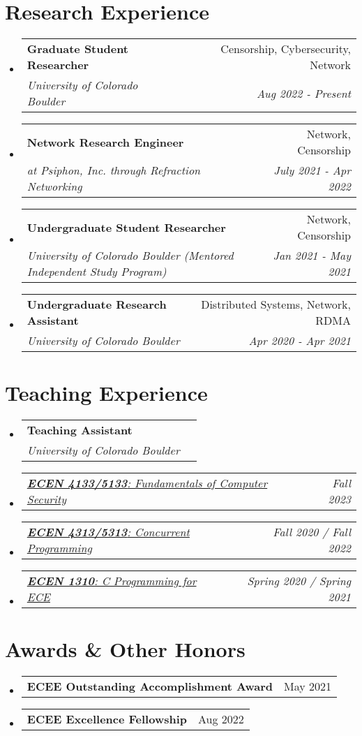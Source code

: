 \documentclass[letterpaper,11pt]{article}
\makeatletter
\newcommand{\resumeSubheading}[4]{
  \vspace{-2pt}\item
    \begin{tabular*}{0.97\textwidth}[t]{l@{\extracolsep{\fill}}r}
      \textbf{#1} & #2 \\
      \textit{\small#3} & \textit{\small #4} \\
    \end{tabular*}\vspace{-7pt}
}
\newcommand{\resumeSubSubheading}[2]{
    \item
    \begin{tabular*}{0.97\textwidth}{l@{\extracolsep{\fill}}r}
      \textit{\small#1} & \textit{\small #2} \\
    \end{tabular*}\vspace{-7pt}
}
\newcommand{\resumeProjectHeading}[2]{
    \item
    \begin{tabular*}{0.97\textwidth}{l@{\extracolsep{\fill}}r}
      \small#1 & #2 \\
    \end{tabular*}\vspace{-7pt}
}
\newcommand{\resumeSubHeadingListStart}{\begin{itemize}[leftmargin=0.15in, label={}]}
\newcommand{\resumeSubHeadingListEnd}{\end{itemize}}
\makeatother
\begin{document}
\section{Research Experience}
\resumeSubHeadingListStart
\resumeSubheading
{Graduate Student Researcher}{Censorship, Cybersecurity, Network}
{University of Colorado Boulder}{Aug 2022 - Present}
\resumeSubheading
{Network Research Engineer}{Network, Censorship}
{at Psiphon, Inc. through Refraction Networking}{July 2021 - Apr 2022}
\resumeSubheading
{Undergraduate Student Researcher}{Network, Censorship}
{University of Colorado Boulder (Mentored Independent Study Program)}{Jan 2021 - May 2021}
\resumeSubheading
{Undergraduate Research Assistant}{Distributed Systems, Network, RDMA}
{University of Colorado Boulder}{Apr 2020 - Apr 2021}
\resumeSubHeadingListEnd
\vspace{1pt}

\section{Teaching Experience}
\resumeSubHeadingListStart
\resumeSubheading
{Teaching Assistant}{}
{University of Colorado Boulder}{}
\resumeSubSubheading
{
  \em\href{https://experts.colorado.edu/display/coursename_ECEN-5133}{\textbf{ECEN 4133/5133}: Fundamentals of Computer Security}
}{Fall 2023}
\resumeSubSubheading
{
  \em\href{https://experts.colorado.edu/display/coursename_ECEN-5313}{\textbf{ECEN 4313/5313}: Concurrent Programming}
}{Fall 2020 / Fall 2022}
\resumeSubSubheading
{
  \em\href{https://experts.colorado.edu/display/coursename_ECEN-1310}{\textbf{ECEN 1310}: C Programming for ECE}
}{Spring 2020 / Spring 2021}
\resumeSubHeadingListEnd
\vspace{1pt}

\section{Awards \& Other Honors}
\resumeSubHeadingListStart
  \resumeProjectHeading {\textbf{ECEE Outstanding Accomplishment Award}}{May 2021}
  \resumeProjectHeading {\textbf{ECEE Excellence Fellowship}}{Aug 2022}
\resumeSubHeadingListEnd
\vspace{1pt}

\end{document}
